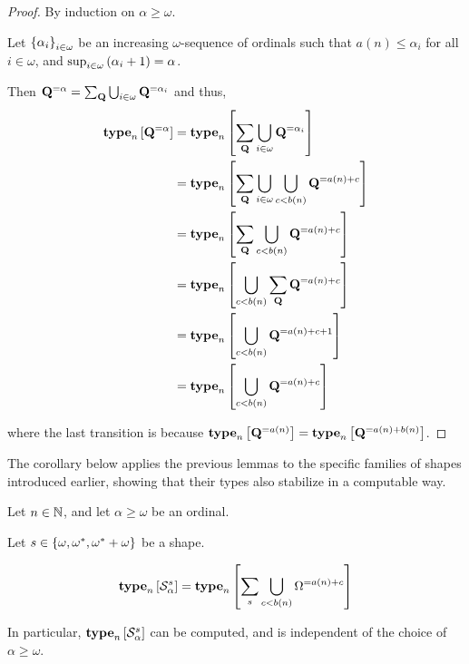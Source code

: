 \begin{proof}
    By induction on $\alpha \ge \omega$.

    Let $\left\{ {\alpha_i} \right\}_{i \in \omega}$ be an increasing $\omega$-sequence of ordinals
    such that $a(n) \le \alpha_i$ for all $i \in \omega$,
    and $\sup_{i \in \omega} \left( {\alpha_i + 1} \right) = \alpha$.

    Then $\mathbf{Q}^{= \alpha} = \sum_{\mathbf{Q}}{\bigcup_{i \in \omega} \mathbf{Q}^{= \alpha_i}}$ and thus,
    \begin{align*}
        \mathbf{type}_{n} \left[ {\mathbf{Q}^{= \alpha}} \right]
         & = \mathbf{type}_{n} \left[ {\sum_{\mathbf{Q}} \bigcup_{i \in \omega} \mathbf{Q}^{= \alpha_i}} \right]                     \\
         & = \mathbf{type}_{n} \left[ {\sum_{\mathbf{Q}} \bigcup_{i \in \omega} \bigcup_{c < b(n)}{\mathbf{Q}^{= a(n) + c}}} \right] \\
         & = \mathbf{type}_{n} \left[ {\sum_{\mathbf{Q}} \bigcup_{c < b(n)}{\mathbf{Q}^{= a(n) + c}}} \right]                        \\
         & = \mathbf{type}_{n} \left[ {\bigcup_{c < b(n)}{\sum_{\mathbf{Q}} \mathbf{Q}^{= a(n) + c}}} \right]                        \\
         & = \mathbf{type}_{n} \left[ {\bigcup_{c < b(n)}{\mathbf{Q}^{= a(n) + c + 1}}} \right]                               \\
         & = \mathbf{type}_{n} \left[ {\bigcup_{c < b(n)}{\mathbf{Q}^{= a(n) + c}}} \right]
    \end{align*}

    where the last transition is because $\mathbf{type}_{n} \left[ {\mathbf{Q}^{= a(n)}} \right] = \mathbf{type}_{n} \left[ {\mathbf{Q}^{= a(n) + b(n)}} \right]$.
\end{proof}

The corollary below applies the previous lemmas to the specific families of shapes introduced earlier, showing that their
types also stabilize in a computable way.

\begin{corollary}
    Let $n \in \mathbb{N}$, and let $\alpha \ge \omega$ be an ordinal.

    Let $s \in \left\{ {\omega, \omega^\ast, \omega^\ast + \omega} \right\}$ be a shape.

    \[
        \mathbf{type}_{n} \left[ {\mathcal{S}^{s}_{\alpha}} \right]
        = \mathbf{type}_{n} \left[ {\sum_{s} {\bigcup_{c < b(n)}{\Omega^{= a(n) + c}}}} \right]
    \]

    In particular, $\mathbf{type}_{n} \left[ {\mathcal{S}^{s}_{\alpha}} \right]$ can be
    computed, and is independent of the choice of $\alpha \ge \omega$.
\end{corollary}

